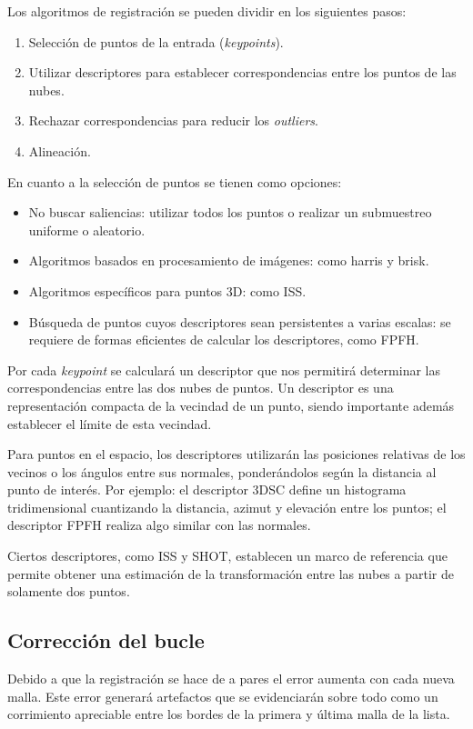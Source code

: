 		Los algoritmos de registración se pueden dividir en los siguientes pasos:
		\begin{enumerate}
			\item Selección de puntos de la entrada (\emph{keypoints}).
			\item Utilizar descriptores para establecer correspondencias entre los puntos de las nubes.
			\item Rechazar correspondencias para reducir los \emph{outliers}.
			\item Alineación.\cite{conf/3dim/RusinkiewiczL01}
		\end{enumerate}

		En cuanto a la selección de puntos se tienen como opciones:
		\begin{itemize}
			\item No buscar saliencias: utilizar todos los puntos o realizar un submuestreo uniforme o aleatorio.
			\item Algoritmos basados en procesamiento de imágenes: como harris y brisk.
			\item Algoritmos específicos para puntos 3D: como ISS.
			\item Búsqueda de puntos cuyos descriptores sean persistentes a varias escalas: se requiere de formas eficientes de calcular los descriptores, como FPFH.
		\end{itemize}

			Por cada \emph{keypoint} se calculará un descriptor que nos
			permitirá determinar las correspondencias entre las dos nubes de
			puntos.
			Un descriptor es una representación compacta
			de la vecindad de un punto,
			siendo importante además establecer el límite de esta vecindad.

			Para puntos en el espacio, los descriptores utilizarán las
			posiciones relativas de los vecinos o los ángulos entre sus
			normales, ponderándolos según la distancia al punto de interés.
			Por ejemplo: el descriptor 3DSC define un histograma tridimensional
			cuantizando la distancia, azimut y elevación entre los puntos;
			el descriptor FPFH realiza algo similar con las normales.

			Ciertos descriptores, como ISS y SHOT, establecen un marco de
			referencia que permite obtener una estimación de la transformación
			entre las nubes a partir de solamente dos puntos.

		\subsection{Corrección del bucle}
			Debido a que la registración se hace de a pares el error aumenta
			con cada nueva malla.
			Este error generará artefactos que se evidenciarán sobre todo como
			un corrimiento apreciable entre los bordes de la primera y última
			malla de la lista.

